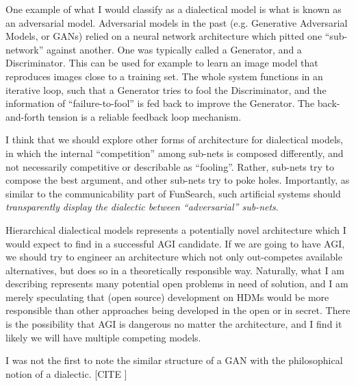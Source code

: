 \documentclass[11pt, oneside]{article}   	%
\begin{document}
One example of what I would classify as a dialectical model is what is known as an adversarial model. Adversarial models in the past (e.g. Generative Adversarial Models, or GANs) relied on a neural network architecture which pitted one ``sub-network'' against another.  One was typically called a Generator, and a Discriminator.  This can be used for example to learn an image model that reproduces images close to a training set.  The whole system functions in an iterative loop, such that a Generator tries to fool the Discriminator, and the information of ``failure-to-fool'' is fed back to improve the Generator.  The back-and-forth tension is a reliable feedback loop mechanism.

I think that we should explore other forms of architecture for dialectical models, in which the internal ``competition'' among sub-nets is composed differently, and not necessarily competitive or describable as ``fooling''.  Rather, sub-nets try to compose the best argument, and other sub-nets try to poke holes.  Importantly, as similar to the communicability part of FunSearch, such artificial systems should \emph{transparently display the dialectic between ``adversarial'' sub-nets}.  

Hierarchical dialectical models represents a potentially novel architecture which I would expect to find in a successful AGI candidate.  If we are going to have AGI, we should try to engineer an architecture which not only out-competes available alternatives, but does so in a theoretically responsible way.  Naturally, what I am describing represents many potential open problems in need of solution, and I am merely speculating that (open source) development on HDMs would be more responsible than other approaches being developed in the open or in secret.  There is the possibility that AGI is dangerous no matter the architecture, and I find it likely we will have multiple competing models.

I was not the first to note the similar structure of a GAN with the philosophical notion of a dialectic.  [CITE ]




\end{document}
